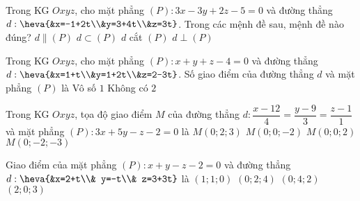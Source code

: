 \begin{ex}%
Trong KG $Oxyz$, cho mặt phẳng $(P): 3x-3y+2z-5=0$ và đường thẳng $d:\heva{&x=-1+2t\\&y=3+4t\\&z=3t}$. Trong các mệnh đề sau, mệnh đề nào đúng?
\choice
{\True $d\parallel (P)$}
{$d\subset (P)$}
{$d$ cắt $(P)$}
{$d\perp (P)$}
\end{ex}

\begin{ex}%
Trong KG $Oxyz$, cho mặt phẳng $(P):x+y+z-4=0$ và đường thẳng $d:\heva{&x=1+t\\&y=1+2t\\&z=2-3t}$. Số giao điểm của đường thẳng $d$ và mặt phẳng $(P)$ là
\choice
{\True Vô số}
{$1$}
{Không có}
{$2$}
\end{ex}

\begin{ex}%
Trong KG $Oxyz$, tọa độ giao điểm $M$ của đường thẳng $d:\dfrac{x-12}{4}=\dfrac{y-9}{3}=\dfrac{z-1}{1}$ và mặt phẳng $(P):3x+5y-z-2=0$ là
\choice
{$M(0;2;3)$}
{\True $M(0;0;-2)$}
{$M(0;0;2)$}
{$M(0;-2;-3)$}
\end{ex}

\begin{ex}%
Giao điểm của mặt phẳng $(P):x+y-z-2=0$ và đường thẳng $d:\heva{&x=2+t\\& y=-t\\& z=3+3t}$ là
\choice
{\True $(1;1;0)$}
{$(0;2;4)$}
{$(0;4;2)$}
{$(2;0;3)$}
\end{ex}

